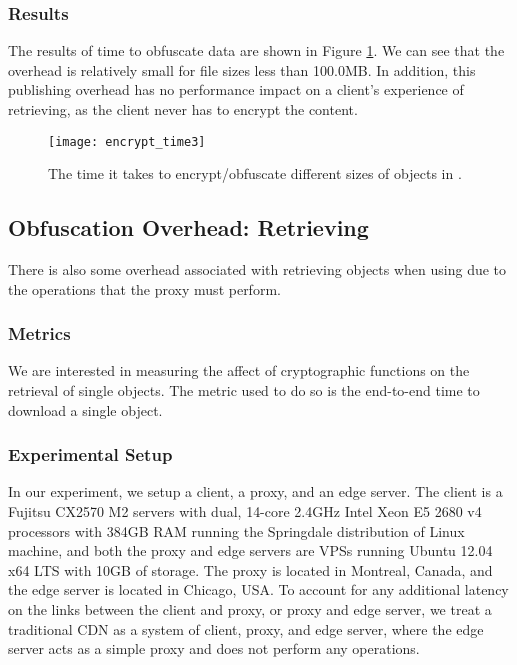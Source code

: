 \subsubsection{Results}
The results of time to obfuscate data are shown in Figure \ref{fig:encrypt_time}.  We can see that the overhead 
is relatively small for file sizes less than 100.0MB.  In addition, this publishing overhead has no performance impact 
on a client's experience of retrieving, as the client never has to encrypt the content.  

\begin{figure}[t]
\centering
\texttt{[image: encrypt\_time3]}
\caption{The time it takes to encrypt/obfuscate different sizes of objects in \system{}.}
\label{fig:encrypt_time}
\end{figure}

\subsection{Obfuscation Overhead: Retrieving}
There is also some overhead associated with retrieving objects when using \system{} due to the operations that 
the proxy must perform.  

\subsubsection{Metrics}
We are interested in measuring the affect of cryptographic functions on the retrieval of single 
objects.  The metric used to do so is the end-to-end time to download a single object.  

\subsubsection{Experimental Setup}
In our experiment, we setup a client, a proxy, and an edge server.  The client is a  Fujitsu CX2570 M2 servers with dual, 
14-core 2.4GHz Intel Xeon E5 2680 v4 processors with 384GB RAM running the Springdale distribution of Linux machine, 
and both the proxy and edge servers are VPSs running Ubuntu 12.04 x64 LTS with 10GB of storage. The proxy is located in 
Montreal, Canada, and the edge server is located in Chicago, USA.  To account for any additional latency on the links between 
the client and proxy, or proxy and edge server, we treat a traditional CDN as a system of client, proxy, and edge server, where 
the edge server acts as a simple proxy and does not perform any operations.  

